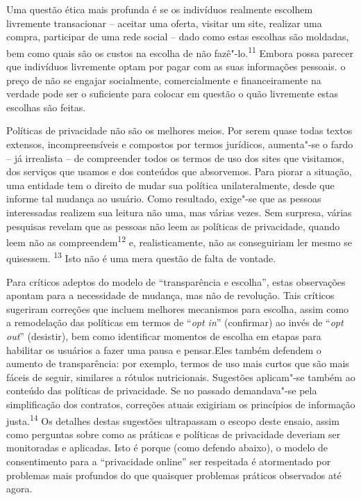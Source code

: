 Uma questão ética mais profunda é se os indivíduos realmente escolhem
livremente transacionar -- aceitar uma oferta, visitar um site, realizar
uma compra, participar de uma rede social -- dado como estas escolhas
são moldadas, bem como quais são os custos na escolha de não
fazê"-lo.\textsuperscript{{11}} Embora possa parecer que indivíduos
livremente optam por pagar com as suas informações pessoais. o preço de
não se engajar socialmente, comercialmente e financeiramente na verdade
pode ser o suficiente para colocar em questão o quão livremente estas
escolhas são feitas.

Políticas de privacidade não são os melhores meios. Por serem quase
todas textos extensos, incompreensíveis e compostos por termos
jurídicos, aumenta"-se o fardo -- já irrealista -- de compreender todos
os termos de uso dos sites que visitamos, dos serviços que usamos e dos
conteúdos que absorvemos. Para piorar a situação, uma entidade tem o
direito de mudar sua política unilateralmente, desde que informe tal
mudança ao usuário. Como resultado, exige"-se que as pessoas interessadas
realizem sua leitura não uma, mas várias vezes. Sem surpresa, várias
pesquisas revelam que as pessoas não leem as políticas de privacidade,
quando leem não as compreendem\textsuperscript{{12}} e, realisticamente,
não as conseguiriam ler mesmo se quisessem. \textsuperscript{{13}} Isto
não é uma mera questão de falta de vontade.

Para críticos adeptos do modelo de ``transparência e escolha'', estas
observações apontam para a necessidade de mudança, mas não de revolução.
Tais críticos sugeriram correções que incluem melhores mecanismos para
escolha, assim como a remodelação das políticas em termos de ``\emph{opt
in}'' (confirmar) ao invés de ``\emph{opt out}'' (desistir), bem como
identificar momentos de escolha em etapas para habilitar os usuários a
fazer uma pausa e pensar.Eles também defendem o aumento de
transparência: por exemplo, termos de uso mais curtos que são mais
fáceis de seguir, similares a rótulos nutricionais. Sugestões aplicam"-se
também ao conteúdo das políticas de privacidade. Se no passado
demandava"-se pela simplificação dos contratos, correções atuais
exigiriam os princípios de informação justa.\textsuperscript{{14}} Os
detalhes destas sugestões ultrapassam o escopo deste ensaio, assim como
perguntas sobre como as práticas e políticas de privacidade deveriam ser
monitoradas e aplicadas. Isto é porque (como defendo abaixo), o modelo
de consentimento para a ``privacidade online'' ser respeitada é
atormentado por problemas mais profundos do que quaisquer problemas
práticos observados até agora.

